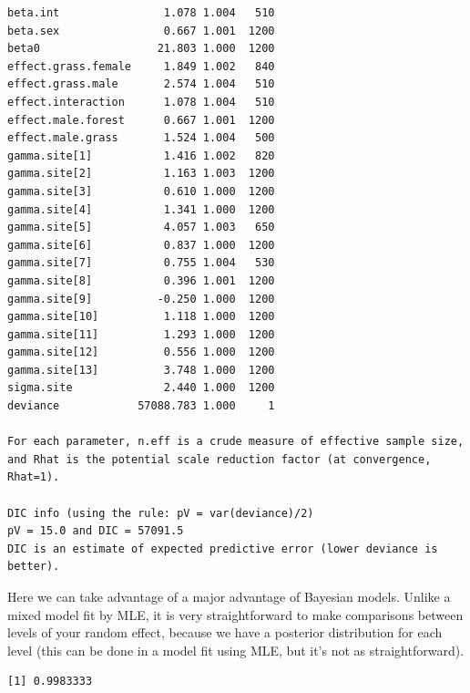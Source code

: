 \documentclass[
  13,
  letterpaper,
]{report}
\newenvironment{Shaded}{\begin{snugshade}}{\end{snugshade}}
\newcommand{\CommentTok}[1]{\textcolor[rgb]{0.37,0.37,0.37}{#1}}
\newcommand{\DecValTok}[1]{\textcolor[rgb]{0.68,0.00,0.00}{#1}}
\newcommand{\FloatTok}[1]{\textcolor[rgb]{0.68,0.00,0.00}{#1}}
\newcommand{\FunctionTok}[1]{\textcolor[rgb]{0.28,0.35,0.67}{#1}}
\newcommand{\NormalTok}[1]{\textcolor[rgb]{0.00,0.23,0.31}{#1}}
\newcommand{\OtherTok}[1]{\textcolor[rgb]{0.00,0.23,0.31}{#1}}
\newcommand{\SpecialCharTok}[1]{\textcolor[rgb]{0.37,0.37,0.37}{#1}}
\newcommand{\StringTok}[1]{\textcolor[rgb]{0.13,0.47,0.30}{#1}}
\begin{document}
\begin{verbatim}
beta.int                1.078 1.004   510
beta.sex                0.667 1.001  1200
beta0                  21.803 1.000  1200
effect.grass.female     1.849 1.002   840
effect.grass.male       2.574 1.004   510
effect.interaction      1.078 1.004   510
effect.male.forest      0.667 1.001  1200
effect.male.grass       1.524 1.004   500
gamma.site[1]           1.416 1.002   820
gamma.site[2]           1.163 1.003  1200
gamma.site[3]           0.610 1.000  1200
gamma.site[4]           1.341 1.000  1200
gamma.site[5]           4.057 1.003   650
gamma.site[6]           0.837 1.000  1200
gamma.site[7]           0.755 1.004   530
gamma.site[8]           0.396 1.001  1200
gamma.site[9]          -0.250 1.000  1200
gamma.site[10]          1.118 1.000  1200
gamma.site[11]          1.293 1.000  1200
gamma.site[12]          0.556 1.000  1200
gamma.site[13]          3.748 1.000  1200
sigma.site              2.440 1.000  1200
deviance            57088.783 1.000     1

For each parameter, n.eff is a crude measure of effective sample size,
and Rhat is the potential scale reduction factor (at convergence, Rhat=1).

DIC info (using the rule: pV = var(deviance)/2)
pV = 15.0 and DIC = 57091.5
DIC is an estimate of expected predictive error (lower deviance is better).
\end{verbatim}

Here we can take advantage of a major advantage of Bayesian models.
Unlike a mixed model fit by MLE, it is very straightforward to make
comparisons between levels of your random effect, because we have a
posterior distribution for each level (this can be done in a model fit
using MLE, but it's not as straightforward).

\begin{Shaded}
\end{Shaded}

\begin{verbatim}
[1] 0.9983333
\end{verbatim}
\end{document}
